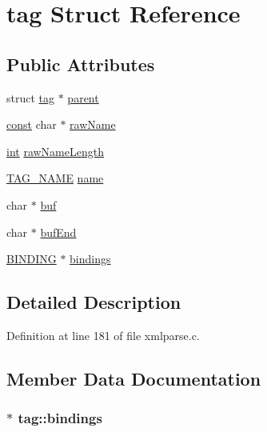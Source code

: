 \hypertarget{structtag}{}\section{tag Struct Reference}
\label{structtag}
\subsection*{Public Attributes}
\begin{DoxyCompactItemize}
\item 
struct \hyperlink{structtag}{tag} $\ast$ \hyperlink{structtag_a3b9ed02158a38c2889611bcf6d20aa36}{parent}
\item 
\hyperlink{getopt1_8c_a2c212835823e3c54a8ab6d95c652660e}{const} char $\ast$ \hyperlink{structtag_a964cfb525c04ed04e49414c73feca8f1}{raw\+Name}
\item 
\hyperlink{xmltok_8h_a5a0d4a5641ce434f1d23533f2b2e6653}{int} \hyperlink{structtag_a5c5de229e856b5076244c0ff51e77d48}{raw\+Name\+Length}
\item 
\hyperlink{struct_t_a_g___n_a_m_e}{T\+A\+G\+\_\+\+N\+A\+ME} \hyperlink{structtag_ad80c412c77ff1e474b6e0b663b703963}{name}
\item 
char $\ast$ \hyperlink{structtag_a626e563f001ca3291df32c1a7511a0a9}{buf}
\item 
char $\ast$ \hyperlink{structtag_ac3cd2ddf9240b603d9326cd2ce1a7558}{buf\+End}
\item 
\hyperlink{xmlparse_8c_a243b660be2393a4a7269d15d76c5fc15}{B\+I\+N\+D\+I\+NG} $\ast$ \hyperlink{structtag_a5cf8503ee843c626661c19f9bd773012}{bindings}
\end{DoxyCompactItemize}


\subsection{Detailed Description}


Definition at line 181 of file xmlparse.\+c.



\subsection{Member Data Documentation}
\subsubsection[{\texorpdfstring{bindings}{bindings}}]{$\ast$ tag\+::bindings}\hypertarget{structtag_a5cf8503ee843c626661c19f9bd773012}{}\label{structtag_a5cf8503ee843c626661c19f9bd773012}


